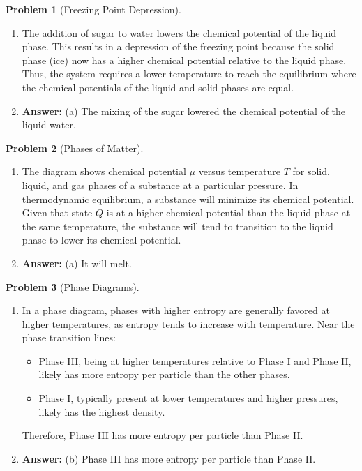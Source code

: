 \documentclass[12pt]{article}
\theoremstyle{definition} %
\newtheorem{problem}{Problem}
\theoremstyle{plain} %
\begin{document}
\begin{problem}[Freezing Point Depression]
    \noindent
    \begin{enumerate}
        \item 
        The addition of sugar to water lowers the chemical potential of the liquid phase. This results in a depression of the freezing point because the solid phase (ice) now has a higher chemical potential relative to the liquid phase. Thus, the system requires a lower temperature to reach the equilibrium where the chemical potentials of the liquid and solid phases are equal.
        
        \item 
        \textbf{Answer:} (a) The mixing of the sugar lowered the chemical potential of the liquid water.
    \end{enumerate}
\end{problem}
\begin{problem}[Phases of Matter]
    \noindent
    \begin{enumerate}
        \item 
        The diagram shows chemical potential \( \mu \) versus temperature \( T \) for solid, liquid, and gas phases of a substance at a particular pressure. In thermodynamic equilibrium, a substance will minimize its chemical potential. Given that state \( Q \) is at a higher chemical potential than the liquid phase at the same temperature, the substance will tend to transition to the liquid phase to lower its chemical potential.

        \item 
        \textbf{Answer:} (a) It will melt.
    \end{enumerate}
\end{problem}
\begin{problem}[Phase Diagrams]
    \noindent
    \begin{enumerate}
        \item 
        In a phase diagram, phases with higher entropy are generally favored at higher temperatures, as entropy tends to increase with temperature. Near the phase transition lines:
        \begin{itemize}
            \item Phase III, being at higher temperatures relative to Phase I and Phase II, likely has more entropy per particle than the other phases.
            \item Phase I, typically present at lower temperatures and higher pressures, likely has the highest density.
        \end{itemize}
        Therefore, Phase III has more entropy per particle than Phase II.

        \item 
        \textbf{Answer:} (b) Phase III has more entropy per particle than Phase II.
    \end{enumerate}
\end{problem}
\end{document}
